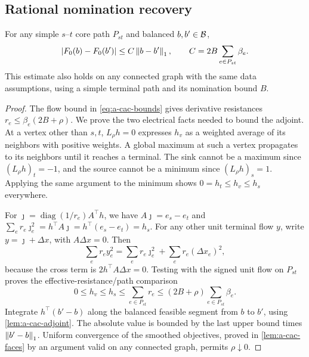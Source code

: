 \subsection{Rational nomination recovery}
\label{subsec:a-cac-recovery}
\begin{lemma}
\label{lem:a-cac-lipschitz}
For any simple $s$--$t$ core path $P_{st}$ and balanced $b,b'\in\mathcal{B}$,
\[
 |F_0(b)-F_0(b')|\le C\left\lVert b-b'\right\rVert_1,
 \qquad C=2B\sum_{e\in P_{st}}\beta_e.
\]
This estimate also holds on any connected graph with the same data
assumptions, using a simple terminal path and its nomination bound $B$.
\end{lemma}
\begin{proof}
The flow bound in \cref{eq:a-cac-bounds} gives derivative resistances
$r_e\le\beta_e(2B+\rho)$. We prove the two electrical facts needed to
bound the adjoint. At a vertex other than $s,t$, $L_\rho h=0$ expresses $h_v$
as a weighted average of its neighbors with positive weights. A global
maximum at such a vertex propagates to its neighbors until it reaches
a terminal. The sink cannot be a maximum since $(L_\rho h)_t=-1$, and the
source cannot be a minimum since $(L_\rho h)_s=1$. Applying the same argument
to the minimum shows $0=h_t\le h_v\le h_s$ everywhere.

For $\jmath=\operatorname{diag}(1/r_e)A^\top h$, we have
$A\jmath=e_s-e_t$ and $\sum_er_e\jmath_e^2=h^\top A\jmath=h^\top(e_s-e_t)=h_s$. For any other unit
terminal flow $y$, write $y=\jmath+\Delta x$, with $A\Delta x=0$. Then
\[
 \sum_er_ey_e^2=\sum_er_e\jmath_e^2+\sum_er_e(\Delta x_e)^2,
\]
because the cross term is $2h^\top A\Delta x=0$. Testing with the signed unit
flow on $P_{st}$ proves the effective-resistance/path comparison
\[
 0\le h_v\le h_s\le\sum_{e\in P_{st}}r_e
                   \le(2B+\rho)\sum_{e\in P_{st}}\beta_e.
\]
Integrate $h^\top(b'-b)$ along the balanced feasible segment from $b$
to $b'$, using \cref{lem:a-cac-adjoint}. The absolute value is bounded
by the last upper bound times $\left\lVert b'-b\right\rVert_1$. Uniform convergence of
the smoothed objectives, proved in \cref{lem:a-cac-faces} by an argument
valid on any connected graph, permits $\rho\downarrow0$.
\end{proof}

